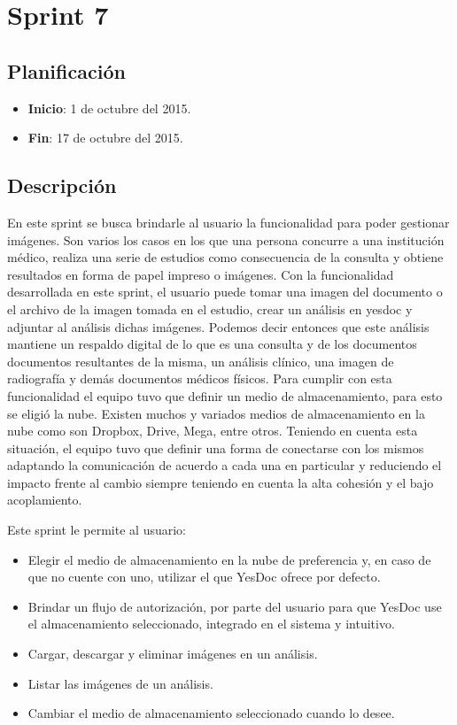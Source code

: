 \section{Sprint 7} %

\subsection{Planificación}
\begin{itemize}
    \item \textbf{Inicio}: 1 de octubre del 2015.
    \item \textbf{Fin}: 17 de octubre del 2015.
\end{itemize}


\subsection{Descripción}

En este sprint se busca brindarle al usuario la funcionalidad para poder gestionar imágenes. Son varios los casos en los que una persona concurre a una institución médico, realiza una serie de estudios como consecuencia de la consulta y obtiene resultados en forma de papel impreso o imágenes. Con la funcionalidad desarrollada en este sprint, el usuario puede tomar una imagen del documento o el archivo de la imagen tomada en el estudio, crear un análisis en yesdoc y adjuntar al análisis dichas imágenes. Podemos decir entonces que este análisis mantiene un respaldo digital de lo que es una consulta y de los documentos documentos resultantes de la misma, un análisis clínico, una imagen de radiografía y demás documentos médicos físicos. Para cumplir con esta funcionalidad el equipo tuvo que definir un medio de almacenamiento, para esto se eligió la nube. Existen muchos y variados medios de almacenamiento en la nube como son Dropbox, Drive, Mega, entre otros. Teniendo en cuenta esta situación, el equipo tuvo que definir una forma de conectarse con los mismos adaptando la comunicación de acuerdo a cada una en particular y reduciendo el impacto frente al cambio siempre teniendo en cuenta la alta cohesión y el bajo acoplamiento.
	
	
	Este sprint le permite al usuario:
	\begin{itemize}
		\item Elegir el medio de almacenamiento en la nube de preferencia y, en caso de que no cuente con uno, utilizar el que YesDoc ofrece por defecto.
		\item Brindar un flujo de autorización, por parte del usuario para que YesDoc use el almacenamiento seleccionado, integrado en el sistema y intuitivo.
		\item Cargar, descargar y eliminar imágenes en un análisis.
		\item Listar las imágenes de un análisis.
		\item Cambiar el medio de almacenamiento seleccionado cuando lo desee. %
	\end{itemize}
	  


